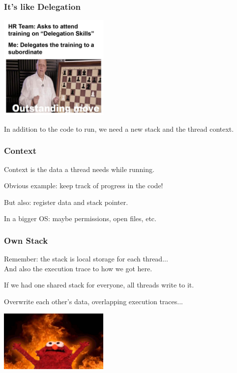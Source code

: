 \begin{frame}
\frametitle{It's like Delegation}

\begin{center}
	\includegraphics[width=0.4\textwidth]{images/delegate2.jpg}
\end{center}

In addition to the code to run, we need a new stack and the thread context.

\end{frame}


\begin{frame}
\frametitle{Context}

Context is the data a thread needs while running.

Obvious example: keep track of progress in the code!

But also: register data and stack pointer.

In a bigger OS: maybe permissions, open files, etc.

\end{frame}



\begin{frame}
\frametitle{Own Stack}

Remember: the stack is local storage for each thread...\\
\quad And also the execution trace to how we got here.

If we had one shared stack for everyone, all threads write to it. 

Overwrite each other's data, overlapping execution traces...
\begin{center}
	\includegraphics[width=0.4\textwidth]{images/chaoselmo.jpg}
\end{center}

\end{frame}


